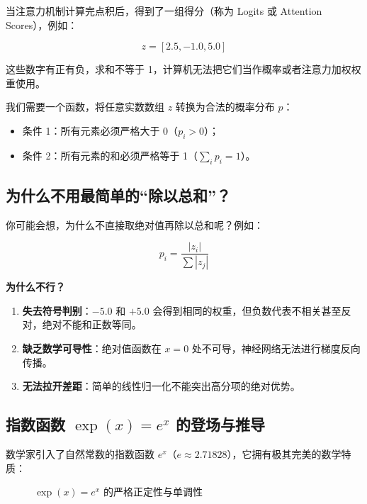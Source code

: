 当注意力机制计算完点积后，得到了一组得分（称为 Logits 或 Attention Scores），例如：

\[
z = [2.5, -1.0, 5.0]
\]

这些数字有正有负，求和不等于 1，计算机无法把它们当作概率或者注意力加权权重使用。

我们需要一个函数，将任意实数数组 $z$ 转换为合法的概率分布 $p$：
\begin{itemize}
  \item 条件 1：所有元素必须严格大于 0（$p_i > 0$）；
  \item 条件 2：所有元素的和必须严格等于 1（$\sum_{i} p_i = 1$）。
\end{itemize}

\subsection{为什么不用最简单的“除以总和”？}

你可能会想，为什么不直接取绝对值再除以总和呢？例如：

\[
p_i = \frac{|z_i|}{\sum |z_j|}
\]

\textbf{为什么不行？}
\begin{enumerate}
  \item \textbf{失去符号判别}：$-5.0$ 和 $+5.0$ 会得到相同的权重，但负数代表不相关甚至反对，绝对不能和正数等同。
  \item \textbf{缺乏数学可导性}：绝对值函数在 $x=0$ 处不可导，神经网络无法进行梯度反向传播。
  \item \textbf{无法拉开差距}：简单的线性归一化不能突出高分项的绝对优势。
\end{enumerate}

\subsection{指数函数 $\exp(x) = e^x$ 的登场与推导}

数学家引入了自然常数的指数函数 $e^x$（$e \approx 2.71828$），它拥有极其完美的数学特质：

\begin{figure}[htbp]
\centering
{}
\caption{$\exp(x) = e^x$ 的严格正定性与单调性}
\end{figure}

